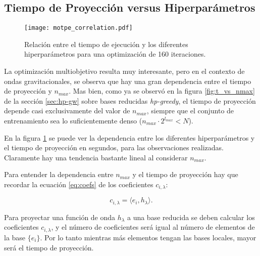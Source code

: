\subsection{Tiempo de Proyección versus Hiperparámetros}
\label{sec:corr_t}

\begin{figure}[p]
\centering
\texttt{[image: motpe\_correlation.pdf]}
\caption{Relación entre el tiempo de ejecución y los diferentes hiperparámetros para una optimización de 160 iteraciones.}
\label{fig:motpe_param_rel}
\end{figure}


La optimización multiobjetivo resulta muy interesante, pero en el contexto de ondas gravitacionales, se observa que hay una gran dependencia entre el tiempo de proyección y $n_{max}$. Mas bien, como ya se observó en la figura \ref{fig:t_vs_nmax} de la sección \ref{sec:hp-gw} sobre bases reducidas \textit{hp-greedy}, el tiempo de proyección depende casi exclusivamente del valor de $n_{max}$, siempre que el conjunto de entrenamiento sea lo suficientemente denso ($n_{max} \cdot 2^{l_{max}} < N$).

En la figura \ref{fig:motpe_param_rel} se puede ver la dependencia entre los diferentes hiperparámetros y el tiempo de proyección en segundos, para las observaciones realizadas. Claramente hay una tendencia bastante lineal al considerar $n_{max}$.

Para entender la dependencia entre $n_{max}$ y el tiempo de proyección hay que recordar la ecuación \eqref{eq:coefs} de los coeficientes $c_{i, \lambda}$:

\[
c_{i, \lambda} = \langle e_i, h_{\lambda} \rangle .
\]

Para proyectar una función de onda $h_{\lambda}$ a una base reducida se deben calcular los coeficientes $c_{i, \lambda}$, y el número de coeficientes será igual al número de elementos de la base $\{  e_i\}$. Por lo tanto mientras más elementos tengan las bases locales, mayor será el tiempo de proyección.
